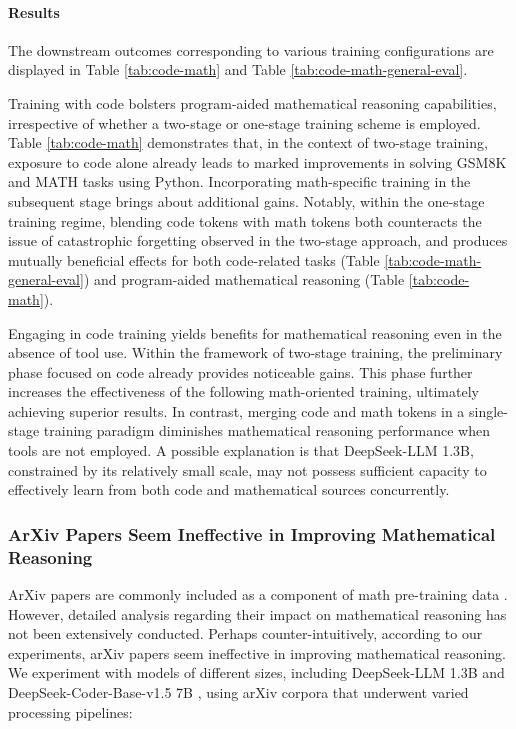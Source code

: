 \begin{itemize}[topsep=0pt]
\paragraph{Results}
The downstream outcomes corresponding to various training configurations are displayed in Table \ref{tab:code-math} and Table \ref{tab:code-math-general-eval}.

Training with code bolsters program-aided mathematical reasoning capabilities, irrespective of whether a two-stage or one-stage training scheme is employed. Table \ref{tab:code-math} demonstrates that, in the context of two-stage training, exposure to code alone already leads to marked improvements in solving GSM8K and MATH tasks using Python. Incorporating math-specific training in the subsequent stage brings about additional gains. Notably, within the one-stage training regime, blending code tokens with math tokens both counteracts the issue of catastrophic forgetting observed in the two-stage approach, and produces mutually beneficial effects for both code-related tasks (Table \ref{tab:code-math-general-eval}) and program-aided mathematical reasoning (Table \ref{tab:code-math}).

Engaging in code training yields benefits for mathematical reasoning even in the absence of tool use. Within the framework of two-stage training, the preliminary phase focused on code already provides noticeable gains. This phase further increases the effectiveness of the following math-oriented training, ultimately achieving superior results. In contrast, merging code and math tokens in a single-stage training paradigm diminishes mathematical reasoning performance when tools are not employed. A possible explanation is that DeepSeek-LLM 1.3B, constrained by its relatively small scale, may not possess sufficient capacity to effectively learn from both code and mathematical sources concurrently.

\subsubsection{ArXiv Papers Seem Ineffective in Improving Mathematical Reasoning}

ArXiv papers are commonly included as a component of math pre-training data \citep{minerva,gpt-f,llemma,mathpile}. However, detailed analysis regarding their impact on mathematical reasoning has not been extensively conducted. Perhaps counter-intuitively, according to our experiments, arXiv papers seem ineffective in improving mathematical reasoning. We experiment with models of different sizes, including DeepSeek-LLM 1.3B and DeepSeek-Coder-Base-v1.5 7B \citep{deepseek-coder}, using arXiv corpora that underwent varied processing pipelines:


\end{itemize}
